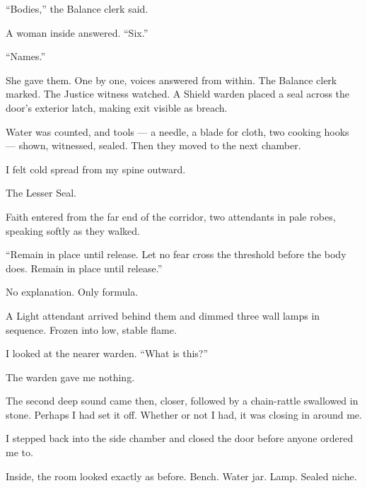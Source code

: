 ``Bodies,'' the Balance clerk said.\par

A woman inside answered. ``Six.''\par

``Names.''\par

She gave them. One by one, voices answered from within. The Balance clerk marked. The Justice witness watched. A Shield warden placed a seal across the door's exterior latch, making exit visible as breach.\par

Water was counted, and tools --- a needle, a blade for cloth, two cooking hooks --- shown, witnessed, sealed. Then they moved to the next chamber.\par

I felt cold spread from my spine outward.\par

The Lesser Seal.\par

Faith entered from the far end of the corridor, two attendants in pale robes, speaking softly as they walked.\par

``Remain in place until release. Let no fear cross the threshold before the body does. Remain in place until release.''\par

No explanation. Only formula.\par

A Light attendant arrived behind them and dimmed three wall lamps in sequence. Frozen into low, stable flame.\par

I looked at the nearer warden. ``What is this?''\par

The warden gave me nothing.\par

The second deep sound came then, closer, followed by a chain-rattle swallowed in stone. Perhaps I had set it off. Whether or not I had, it was closing in around me.\par

\ornament

I stepped back into the side chamber and closed the door before anyone ordered me to.\par

Inside, the room looked exactly as before. Bench. Water jar. Lamp. Sealed niche.\par

